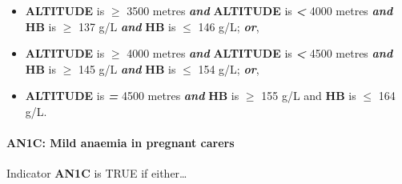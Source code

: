 \documentclass[12pt,a4paper]{article}
\let\oldparagraph\paragraph
\renewcommand{\paragraph}[1]{\oldparagraph{#1}\mbox{}}
\begin{document}
\begin{itemize}
\begin{itemize}
  \item
    \textbf{ALTITUDE} is \textbf{\emph{\(\geq\)}} 3500 metres \textbf{\emph{and}} \textbf{ALTITUDE} is \textbf{\emph{\textless{}}} 4000 metres \textbf{\emph{and}} \textbf{HB} is \textbf{\emph{\(\geq\)}} 137 g/L \textbf{\emph{and}} \textbf{HB} is \textbf{\emph{\(\leq\)}} 146 g/L; \textbf{\emph{or}},
  \item
    \textbf{ALTITUDE} is \textbf{\emph{\(\geq\)}} 4000 metres \textbf{\emph{and}} \textbf{ALTITUDE} is \textbf{\emph{\textless{}}} 4500 metres \textbf{\emph{and}} \textbf{HB} is \textbf{\emph{\(\geq\)}} 145 g/L \textbf{\emph{and}} \textbf{HB} is \textbf{\emph{\(\leq\)}} 154 g/L; \textbf{\emph{or}},
  \item
    \textbf{ALTITUDE} is \textbf{\emph{=}} 4500 metres \textbf{\emph{and}} \textbf{HB} is \textbf{\emph{\(\geq\)}} 155 g/L and \textbf{HB} is \textbf{\emph{\(\leq\)}} 164 g/L.
  \end{itemize}
\end{itemize}

\newpage

\hypertarget{an1c-mild-anaemia-in-pregnant-carers}{%
\paragraph{AN1C: Mild anaemia in pregnant carers}\label{an1c-mild-anaemia-in-pregnant-carers}}

Indicator \textbf{AN1C} is TRUE if either\ldots{}
\end{document}
